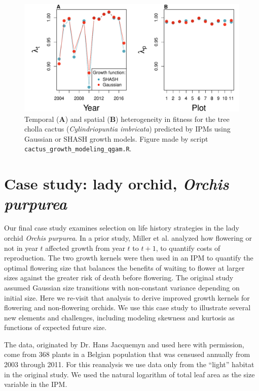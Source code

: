 \documentclass[12pt]{article}
\begin{document}
\begin{figure}[tbp]
	\centering
	\includegraphics[width=1.0\textwidth]{figures/cactus_lambda_years_plots.pdf}
	\caption{Temporal (\textbf{A}) and spatial (\textbf{B}) heterogeneity in fitness for the tree cholla cactus (\textit{Cylindriopuntia imbricata}) predicted by IPMs using Gaussian or SHASH growth models. Figure made by script \texttt{cactus\_growth\_modeling\_qgam.R}.}
	\label{fig:cactus_lambda}
\end{figure} 

 
\section{Case study: lady orchid, \emph{Orchis purpurea}}
\label{sec:orchidCaseStudy} 
Our final case study examines selection on life history strategies in the lady orchid \textit{Orchis purpurea}. 
In a prior study, Miller et al. \citeyear{miller2012evolutionary} analyzed how flowering or not in year $t$ affected growth from year $t$ to $t+1$, to quantify costs of reproduction. 
The two growth kernels were then used in an IPM to quantify the optimal flowering size that balances the benefits of waiting to flower at larger sizes against the greater risk of death before flowering. 
The original study assumed Gaussian size transitions with non-constant variance depending on initial size. 
Here we re-visit that analysis to derive improved growth kernels for flowering and non-flowering orchids. 
We use this case study to illustrate several new elements and challenges, including modeling skewness and kurtosis as functions of expected future size.

The data, originated by Dr. Hans Jacquemyn and used here with permission, come from 368 plants in a Belgian population that was censused annually from 2003 through 2011. For this reanalysis we use data only from the ``light'' habitat in the original study. 
We used the natural logarithm of total leaf area as the size variable in the IPM. 
\end{document}
